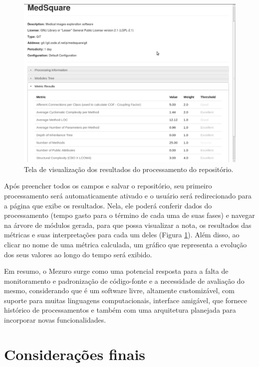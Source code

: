 \documentclass{llncs}
\begin{document}
  \begin{figure}[htb]
    \centering
    \includegraphics[width=\textwidth]{images/new-repository-results.png}
    \caption{Tela de visualização dos resultados do processamento do repositório.}
    \label{fig:results}
  \end{figure}

Após preencher todos os campos e salvar o repositório, seu primeiro
processamento será automaticamente ativado e o usuário será redirecionado para
a página que exibe os resultados. Nela, ele poderá conferir dados do
processamento (tempo gasto para o término de cada uma de suas fases) e navegar
na árvore de módulos gerada, para que possa visualizar a nota, os resultados
das métricas e suas interpretações para cada um deles (Figura
\ref{fig:results}). Além disso, ao clicar no nome de uma métrica calculada, um
gráfico que representa a evolução dos seus valores ao longo do tempo será
exibido.

Em resumo, o Mezuro surge como uma potencial resposta para a falta de
monitoramento e padronização de código-fonte e a necessidade de avaliação do
mesmo, considerando que é um software livre, altamente customizável, com
suporte para muitas linguagens computacionais, interface amigável, que fornece
histórico de processamentos e também com uma arquitetura planejada para
incorporar novas funcionalidades.

\section{Considerações finais}
\label{sec:consideracoes-finais}
\end{document}
